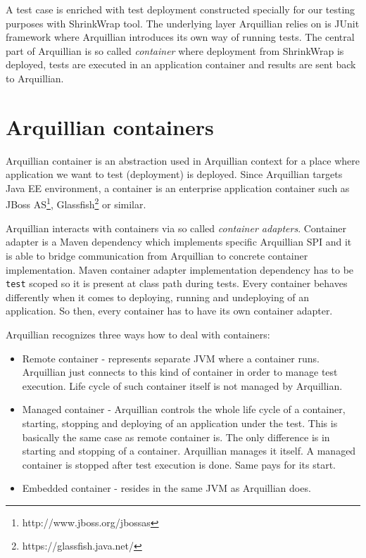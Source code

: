 \documentclass[12pt,final,oneside]{fithesis}
\begin{document}
A test case is enriched with test deployment constructed specially for our testing purposes with ShrinkWrap tool. The underlying layer Arquillian relies on is JUnit framework where Arquillian introduces its own way of running tests. The central part of Arquillian is so called \textit{container} where deployment from ShrinkWrap is deployed, tests are executed in an application container and results are sent back to Arquillian.

\newpage

	\section{Arquillian containers}
	
Arquillian container is an abstraction used in Arquillian context for a place where application we want to test (deployment) is deployed. Since Arquillian targets Java EE environment, a container is an enterprise application container such as JBoss AS\footnote{http://www.jboss.org/jbossas}, Glassfish\footnote{https://glassfish.java.net/} or similar.

Arquillian interacts with containers via so called \textit{container adapters}. Container adapter is a Maven dependency which implements specific Arquillian SPI and it is able to bridge communication from Arquillian to concrete container implementation. Maven container adapter implementation dependency has to be \texttt{test} scoped so it is present at class path during tests. Every container behaves differently when it comes to deploying, running and undeploying of an application. So then, every container has to have its own container adapter.

Arquillian recognizes three ways how to deal with containers: 
	
\begin{itemize}
	\item{Remote container - represents separate JVM where a container runs. Arquillian just connects to this kind of container in order to manage test execution. Life cycle of such container itself is not managed by Arquillian.}
	\item{Managed container - Arquillian controls the whole life cycle of a container, starting, stopping and deploying of an application under the test. This is basically the same case as remote container is. The only difference is in starting and stopping of a container. Arquillian manages it itself. A managed container is stopped after test execution is done. Same pays for its start.} 
	\item{Embedded container - resides in the same JVM as Arquillian does.}
\end{itemize}	
\end{document}
